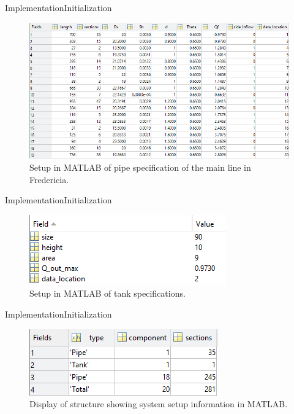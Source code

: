 \begin{frame}{Implementation}{Initialization}
\begin{figure}[!h]
\centering
\includegraphics[width=0.97 \textwidth]{figures/Fredericia_pipe_setup2.PNG}
\caption{Setup in MATLAB of pipe specification of the main line in Fredericia.}
\label{fig:Fredericia_pipe_setup}
\end{figure}


\end{frame}
\begin{frame}{Implementation}{Initialization}
    \begin{figure}[H]
\centering
\includegraphics[width=0.5 \textwidth]{figures/tank_spec}
\caption{Setup in MATLAB of tank specifications.}
\label{fig:Fredericia_pipe_setup}
\end{figure}
\end{frame}

\begin{frame}{Implementation}{Initialization}
    
\begin{figure}[H]
\centering
\includegraphics[width=0.5 \textwidth]{figures/sys_setup_matlab.png}
\caption{Display of structure showing system setup information in MATLAB.}
\label{fig:sys_setup_matlab}
\end{figure}

\end{frame}

